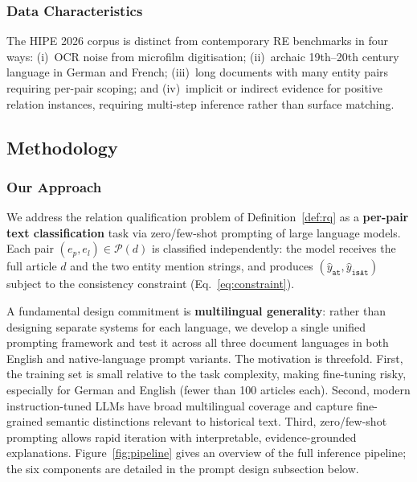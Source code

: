 \documentclass[
]{ceurart}
\theoremstyle{definition}
\begin{document}
\subsubsection{Data Characteristics}

The HIPE 2026 corpus is distinct from contemporary RE benchmarks in four ways: (i)~OCR noise from microfilm digitisation; (ii)~archaic 19th--20th century language in German and French; (iii)~long documents with many entity pairs requiring per-pair scoping; and (iv)~implicit or indirect evidence for positive relation instances, requiring multi-step inference rather than surface matching.

\subsection{Methodology}

\subsubsection{Our Approach}

We address the relation qualification problem of Definition~\ref{def:rq} as a \textbf{per-pair text classification} task via zero/few-shot prompting of large language models. Each pair $(e_p, e_l) \in \mathcal{P}(d)$ is classified independently: the model receives the full article $d$ and the two entity mention strings, and produces $(\hat{y}_{\texttt{at}}, \hat{y}_{\texttt{isAt}})$ subject to the consistency constraint (Eq.~\ref{eq:constraint}).

A fundamental design commitment is \textbf{multilingual generality}: rather than designing separate systems for each language, we develop a single unified prompting framework and test it across all three document languages in both English and native-language prompt variants.
The motivation is threefold.
First, the training set is small relative to the task complexity, making fine-tuning risky, especially for German and English (fewer than 100 articles each).
Second, modern instruction-tuned LLMs have broad multilingual coverage and capture fine-grained semantic distinctions relevant to historical text.
Third, zero/few-shot prompting allows rapid iteration with interpretable, evidence-grounded explanations.
Figure~\ref{fig:pipeline} gives an overview of the full inference pipeline; the six components are detailed in the prompt design subsection below.
\end{document}
